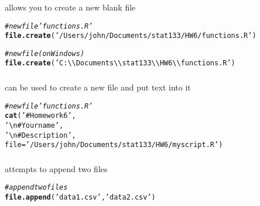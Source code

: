 \documentclass[12pt]{beamer}\usepackage[]{graphicx}\usepackage[]{color}
\makeatletter
\newcommand{\hlstr}[1]{\textcolor[rgb]{0.192,0.494,0.8}{#1}}%
\newcommand{\hlcom}[1]{\textcolor[rgb]{0.678,0.584,0.686}{\textit{#1}}}%
\newcommand{\hlstd}[1]{\textcolor[rgb]{0.345,0.345,0.345}{#1}}%
\newcommand{\hlkwc}[1]{\textcolor[rgb]{0.333,0.667,0.333}{#1}}%
\newcommand{\hlkwd}[1]{\textcolor[rgb]{0.737,0.353,0.396}{\textbf{#1}}}%
\newenvironment{kframe}{%
 \def\at@end@of@kframe{}%
 \ifinner\ifhmode%
  \def\at@end@of@kframe{\end{minipage}}%
  \begin{minipage}{\columnwidth}%
 \fi\fi%
 \def\FrameCommand##1{\hskip\@totalleftmargin \hskip-\fboxsep
 \colorbox{shadecolor}{##1}\hskip-\fboxsep
     \hskip-\linewidth \hskip-\@totalleftmargin \hskip\columnwidth}%
 \MakeFramed {\advance\hsize-\width
   \@totalleftmargin\z@ \linewidth\hsize
   \@setminipage}}%
 {\par\unskip\endMakeFramed%
 \at@end@of@kframe}
\newenvironment{knitrout}{}{} %
\makeatother
\begin{document}
\begin{frame}[fragile]
\frametitle{}

{\hilit {}} allows you to create a new blank file
\begin{knitrout}\footnotesize
{}\color{fgcolor}\begin{kframe}
\begin{alltt}
\hlcom{# new file 'functions.R'}
\hlkwd{file.create}\hlstd{(}\hlstr{'/Users/john/Documents/stat133/HW6/functions.R'}\hlstd{)}

\hlcom{# new file (on Windows)}
\hlkwd{file.create}\hlstd{(}\hlstr{'C:\textbackslash{}\textbackslash{}Documents\textbackslash{}\textbackslash{}stat133\textbackslash{}\textbackslash{}HW6\textbackslash{}\textbackslash{}functions.R'}\hlstd{)}
\end{alltt}
\end{kframe}
\end{knitrout}

\end{frame}


\begin{frame}[fragile]
\frametitle{}

{\hilit {}} can be used to create a new file and put text into it
\begin{knitrout}\footnotesize
{}\color{fgcolor}\begin{kframe}
\begin{alltt}
\hlcom{# new file 'functions.R'}
\hlkwd{cat}\hlstd{(}\hlstr{'# Homework 6'}\hlstd{,}
    \hlstr{'\textbackslash{}n# Your name'}\hlstd{,}
    \hlstr{'\textbackslash{}n# Description'}\hlstd{,}
    \hlkwc{file} \hlstd{=} \hlstr{'/Users/john/Documents/stat133/HW6/myscript.R'}\hlstd{)}
\end{alltt}
\end{kframe}
\end{knitrout}

\end{frame}


\begin{frame}[fragile]
\frametitle{}

{\hilit {}} attempts to append two files
\begin{knitrout}\footnotesize
{}\color{fgcolor}\begin{kframe}
\begin{alltt}
\hlcom{# append two files}
\hlkwd{file.append}\hlstd{(}\hlstr{'data1.csv'}\hlstd{,} \hlstr{'data2.csv'}\hlstd{)}
\end{alltt}
\end{kframe}
\end{knitrout}

\end{frame}
\end{document}
